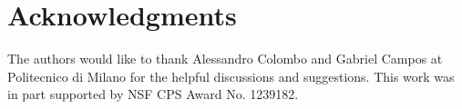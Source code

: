 \documentclass{sig-alternate}
\begin{document}
\section{Acknowledgments}
The authors would like to thank Alessandro Colombo and Gabriel Campos at Politecnico di Milano for the helpful discussions and suggestions. This work was in part supported by NSF CPS Award No. 1239182.




 
\end{document}
